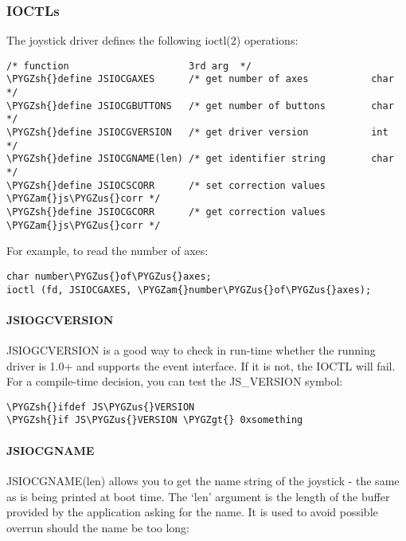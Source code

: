 \documentclass[a4paper,8pt,english]{sphinxmanual}
\def\PYGZus{\char`\_}
\def\PYGZam{\char`\&}
\def\PYGZgt{\char`\>}
\def\PYGZsh{\char`\#}
\begin{document}
\subsubsection{IOCTLs}
\label{input/joydev/joystick-api:ioctls}
The joystick driver defines the following ioctl(2) operations:

\begin{Verbatim}[commandchars=\\\{\}]
                        /* function                     3rd arg  */
\PYGZsh{}define JSIOCGAXES      /* get number of axes           char     */
\PYGZsh{}define JSIOCGBUTTONS   /* get number of buttons        char     */
\PYGZsh{}define JSIOCGVERSION   /* get driver version           int      */
\PYGZsh{}define JSIOCGNAME(len) /* get identifier string        char     */
\PYGZsh{}define JSIOCSCORR      /* set correction values        \PYGZam{}js\PYGZus{}corr */
\PYGZsh{}define JSIOCGCORR      /* get correction values        \PYGZam{}js\PYGZus{}corr */
\end{Verbatim}

For example, to read the number of axes:

\begin{Verbatim}[commandchars=\\\{\}]
char number\PYGZus{}of\PYGZus{}axes;
ioctl (fd, JSIOCGAXES, \PYGZam{}number\PYGZus{}of\PYGZus{}axes);
\end{Verbatim}


\paragraph{JSIOGCVERSION}
\label{input/joydev/joystick-api:jsiogcversion}
JSIOGCVERSION is a good way to check in run-time whether the running
driver is 1.0+ and supports the event interface. If it is not, the
IOCTL will fail. For a compile-time decision, you can test the
JS\_VERSION symbol:

\begin{Verbatim}[commandchars=\\\{\}]
\PYGZsh{}ifdef JS\PYGZus{}VERSION
\PYGZsh{}if JS\PYGZus{}VERSION \PYGZgt{} 0xsomething
\end{Verbatim}


\paragraph{JSIOCGNAME}
\label{input/joydev/joystick-api:jsiocgname}
JSIOCGNAME(len) allows you to get the name string of the joystick - the same
as is being printed at boot time. The `len' argument is the length of the
buffer provided by the application asking for the name. It is used to avoid
possible overrun should the name be too long:
\end{document}

